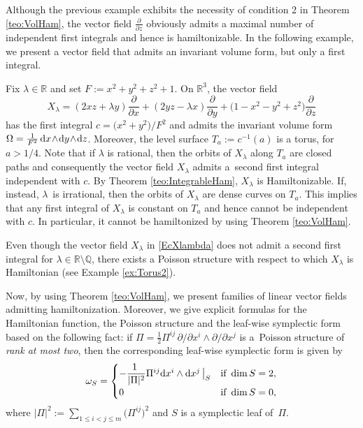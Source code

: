 \documentclass[pdftex]{sigma}%
\newcommand{\R}[1]{\mathbb{R}^{#1}}
\newcommand{\dd}{{\rm d}}
\numberwithin{equation}{section}
\begin{document}
Although the previous example exhibits the necessity of condition 2 in Theorem \ref{teo:VolHam}, the vector field $\tfrac{\partial}{\partial z}$ obviously admits a maximal number of independent first integrals and hence is hamiltonizable. In the following example, we present a vector field that admits an invariant volume form, but only a first integral.

\begin{Example}\label{ex:Torus1}
Fix $\lambda \in \mathbb{R}$ and set $F:= x^2+y^2+z^2+1$. On $\R{3}$, the vector field
 \begin{equation}\label{EcXlambda}
 X_{\lambda} = (2xz+\lambda y)\frac{\partial}{\partial x} + (2yz-\lambda x)\frac{\partial}{\partial y} + \big(1-x^2-y^2+z^2\big)\frac{\partial}{\partial z}
 \end{equation}
has the first integral $c = \big(x^2\!+\!y^2\big)/F^2$ and admits the invariant volume form $\Omega = \frac{1}{F^2}\,\dd x \!\wedge \!\dd y \!\wedge\! \dd z$. Moreover, the level surface $T_{a} := c^{-1}(a)$ is a torus, for $a > 1/4$. Note that if $\lambda$ is rational, then the orbits of $X_{\lambda}$ along $T_{a}$ are closed paths and consequently the vector field $X_{\lambda}$ admits a~second first integral independent with $c$. By Theorem \ref{teo:IntegrableHam}, $X_\lambda$ is Hamiltonizable. If, instead, $\lambda$~is irrational, then the orbits of $X_{\lambda}$ are dense curves on $T_{a}$. This implies that any first integral of $X_{\lambda}$ is constant on $T_{a}$ and hence cannot be independent with $c$. In particular, it cannot be hamiltonized by using Theorem \ref{teo:VolHam}.
\end{Example}

\begin{Remark}
Even though the vector field $X_{\lambda}$ in \eqref{EcXlambda} does not admit a second first integral for $\lambda \in \mathbb{R} \setminus \mathbb{Q}$, there exists a Poisson structure with respect to which $X_{\lambda}$ is Hamiltonian (see Example \ref{ex:Torus2}).
\end{Remark}

Now, by using Theorem \ref{teo:VolHam}, we present families of linear vector fields admitting hamiltonization. Moreover, we give explicit formulas for the Hamiltonian function, the Poisson structure and the leaf-wise symplectic form based on the following fact: if $\Pi=\frac{1}{2}\Pi^{ij}\,\partial/\partial{x^{i}} \wedge \partial/\partial{x^{j}}$ is a~Poisson structure of \emph{rank at most two}, then the corresponding leaf-wise symplectic form is given by
 \begin{equation}\label{eq:FormaSimplect2}
 \omega_{S} =
 \begin{cases}
 -\dfrac{1\ }{|\Pi|^{2}} \Pi^{ij}\dd{x^{i}} \wedge \dd{x^{j}}\,\big|_{S} & \text{if} \  \dim{S} = 2, \\
 0 & \text{if} \ \dim{S} = 0,
 \end{cases}
 \end{equation}
where $|\Pi|^{2} := \sum_{1 \leq i < j \leq m}\big(\Pi^{ij}\big)^{2}$ and $S$ is a symplectic leaf of~$\Pi$.
\end{document}
